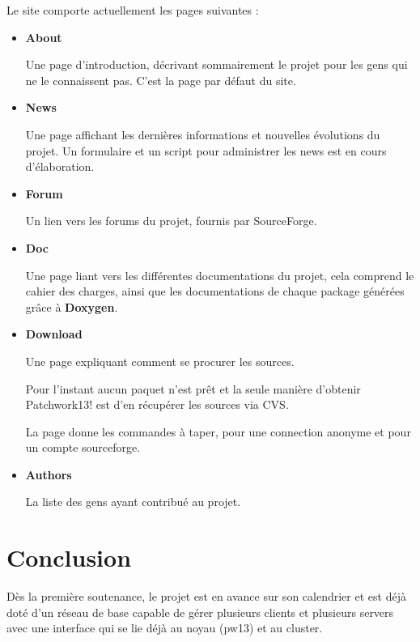 \documentclass[14pt,a4paper]{report}
\begin{document}
Le site comporte actuellement les pages suivantes :
\begin{itemize}
\item {\bf About}

  Une page d'introduction, d\'ecrivant sommairement le projet
  pour les gens qui ne le connaissent pas.
  C'est la page par d\'efaut du site. \\

\item {\bf News}

  Une page affichant les derni\`eres informations et nouvelles
  \'evolutions du projet. Un formulaire et un script pour
  administrer les news est en cours d'\'elaboration. \\

\item {\bf Forum}

  Un lien vers les forums du projet, fournis par SourceForge. \\

\item {\bf Doc}

  Une page liant vers les diff\'erentes documentations du projet,
  cela comprend le cahier des charges, ainsi que les documentations
  de chaque package g\'en\'er\'ees gr\^ace \`a {\bf Doxygen}. \\

\item {\bf Download}

  Une page expliquant comment se procurer les sources.
  
  Pour l'instant aucun paquet n'est pr\^et et la seule mani\`ere
  d'obtenir Patchwork13! est d'en r\'ecup\'erer les sources via CVS.

  La page donne les commandes \`a taper, pour une connection
  anonyme et pour un compte sourceforge. \\

\item {\bf Authors}

  La liste des gens ayant contribu\'e au projet. \\


\end{itemize}

\chapter{Conclusion}

D\`es la premi\`ere soutenance, le projet est en avance sur son calendrier
et est d\'ej\`a dot\'e d'un r\'eseau de base capable de g\'erer plusieurs 
clients et plusieurs servers avec une interface qui se lie d\'ej\`a
au noyau (pw13) et au cluster.
\end{document}
